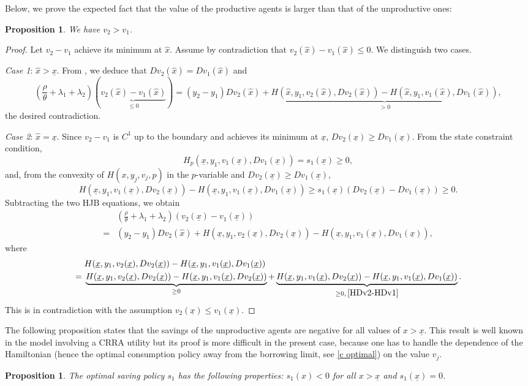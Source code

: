 \documentclass[11pt]{article}
\numberwithin{equation}{section}
\newtheorem{prop}[thm]{Proposition}
\theoremstyle{definition}
\newcommand{\ux}{{\underline x}}
\newcommand{\beq}{\begin{equation}}
\newcommand{\eeq}{\end{equation}}
\newcommand{\hx}{\hat{x}}
\newcommand{\lc}{\left(}
\newcommand{\rc}{\right)}
\theoremstyle{plain}
\begin{document}
Below, we prove the expected fact that the value of the productive agents is larger than that of the unproductive ones: 
\begin{prop}\label{Prop: v2 v1}
We have $v_2> v_1$.
\end{prop}
\begin{proof}
Let $v_2-v_1$ achieve its minimum at $\hx$. Assume by contradiction that $v_2(\hx)-v_1(\hx)\leq 0$. We {}{distinguish} two cases.\par
{\textit{Case 1}}:  $\hx>\ux$. From , we deduce that $Dv_2(\hx)=Dv_1(\hx)$ and 
$$
\lc \frac{\rho}{\theta}+\lambda_1+\lambda_2\rc(\underbrace{v_2(\hx)-v_1(\hx)}_{\leq 0})=(y_2-y_1)Dv_2(\hx)+\underbrace{H(\hx,y_1,v_2(\hx),Dv_2(\hx))-H(\hx,y_1,v_1(\hx),Dv_1(\hx))}_{>0},
$$
the desired contradiction. \par
{\textit{Case 2}}:  $\hx=\ux$. Since $v_2-v_1$ is $C^1$ up to the boundary and achieves its minimum at $\ux$, $Dv_2(\ux)\geq Dv_1(\ux)$. From the state constraint condition,  
$$
H_p(\ux,y_1,v_1(\ux),Dv_1(\ux))=s_1(\ux)\geq 0,
$$
and, from the convexity of $H(x,y_j,v_j,p)$ in the $p$-variable and $Dv_2(\ux)\geq Dv_1(\ux)$, 
\beq\label{HDv2-HDv1}
H(\ux,y_1,v_1(\ux),Dv_2(\ux))-H(\ux,y_1,v_1(\ux),Dv_1(\ux))\geq s_1(\ux)\lc Dv_2(\ux)-Dv_1(\ux)\rc\geq 0.
\eeq
Subtracting the two HJB equations, we obtain
\begin{align*}
&\lc \frac{\rho}{\theta}+\lambda_1+\lambda_2\rc (v_2(\ux)-v_1(\ux))\\
={}& (y_2-y_1)Dv_2(\hx)+H(\ux,y_1,v_2(\ux),Dv_2(\ux))-H(\ux,y_1,v_1(\ux),Dv_1(\ux)),
\end{align*}
where
\begin{align*}
&H(\ux,y_1,v_2(\ux),Dv_2(\ux))-H(\ux,y_1,v_1(\ux),Dv_1(\ux))\\
={}&\underbrace{H(\ux,y_1,v_2(\ux),Dv_2(\ux))-H(\ux,y_1,v_1(\ux),Dv_2(\ux))}_{\geq 0}+\underbrace{H(\ux,y_1,v_1(\ux),Dv_2(\ux))-H(\ux,y_1,v_1(\ux),Dv_1(\ux))}_{\geq 0,\,\Cref{HDv2-HDv1}}.
\end{align*}
This is in contradiction with the assumption $v_2(\ux)\leq v_1(\ux)$. 
\end{proof}
The following proposition states that the savings of the unproductive agents are negative for all values of $x>\ux$. This result is well known in the model involving a CRRA utility but its proof is more difficult in the present case, because one has to handle the {}{dependence of the Hamiltonian} (hence the optimal consumption policy away from the borrowing limit, see \eqref{c optimal}) on the value $v_j$. 
\begin{prop}\label{Prop: s1<0}
The optimal saving policy $s_1$ has the following properties: $s_1(x)< 0$ for all $x> \ux$ and $s_1(\ux)=0$. 
\end{prop}
\end{document}
